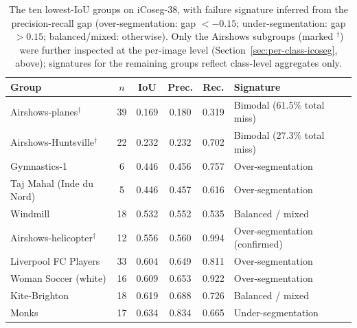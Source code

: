 \begin{table}[t]
\centering
\caption{The ten lowest-IoU groups on iCoseg-38, with failure signature inferred from the precision-recall gap (over-segmentation: gap $<-0.15$; under-segmentation: gap $>0.15$; balanced/mixed: otherwise). Only the Airshows subgroups (marked $^\dagger$) were further inspected at the per-image level (Section~\ref{sec:per-class-icoseg}, above); signatures for the remaining groups reflect class-level aggregates only.}
\label{tab:icoseg38-lowest-groups}
\begin{tabular}{lccccl}
\toprule
Group & $n$ & IoU & Prec. & Rec. & Signature \\
\midrule
Airshows-planes$^\dagger$        & 39 & 0.169 & 0.180 & 0.319 & Bimodal (61.5\% total miss) \\
Airshows-Huntsville$^\dagger$    & 22 & 0.232 & 0.232 & 0.702 & Bimodal (27.3\% total miss) \\
Gymnastics-1                     &  6 & 0.446 & 0.456 & 0.757 & Over-segmentation \\
Taj Mahal (Inde du Nord)         &  5 & 0.446 & 0.457 & 0.616 & Over-segmentation \\
Windmill                         & 18 & 0.532 & 0.552 & 0.535 & Balanced / mixed \\
Airshows-helicopter$^\dagger$    & 12 & 0.556 & 0.560 & 0.994 & Over-segmentation (confirmed) \\
Liverpool FC Players             & 33 & 0.604 & 0.649 & 0.811 & Over-segmentation \\
Woman Soccer (white)             & 16 & 0.609 & 0.653 & 0.922 & Over-segmentation \\
Kite-Brighton                    & 18 & 0.619 & 0.688 & 0.726 & Balanced / mixed \\
Monks                            & 17 & 0.634 & 0.834 & 0.665 & Under-segmentation \\
\bottomrule
\end{tabular}
\end{table}

